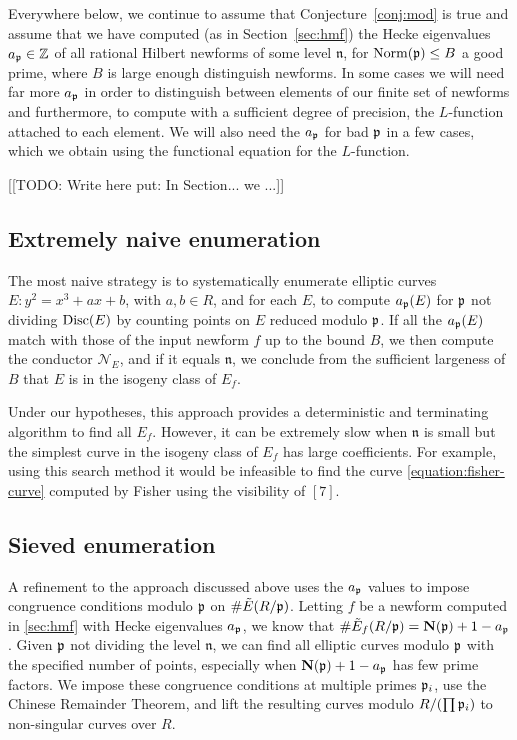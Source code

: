 \documentclass{amsart}
\newcommand{\n}{\mathfrak{n}}
\newcommand{\cN}{\mathcal{N}}
\begin{document}
Everywhere below, we continue to assume that Conjecture~\ref{conj:mod}
is true and assume that we have computed (as in Section~\ref{sec:hmf})
the Hecke eigenvalues $a_{\mathfrak{p}}\in \mathbb{Z}$ of all rational Hilbert newforms of
some level $\n$, for $\operatorname{Norm}(\mathfrak{p})\leq B$ a good prime, where $B$ is
large enough distinguish newforms. In some cases we will need far more
$a_{\mathfrak{p}}$ in order to distinguish between elements of our finite set of
newforms and furthermore, to compute with a sufficient degree of
precision, the $L$-function attached to each element.  We will also
need the $a_{\mathfrak{p}}$ for bad $\mathfrak{p}$ in a few cases, which we obtain
using the functional equation for the $L$-function.

[[TODO: Write here put: In Section... we ...]]

\subsection{Extremely naive enumeration}\label{sec:naive}

The most naive strategy is to systematically enumerate 
 elliptic curves $E: y^2 = x^3 + ax + b$, with $a,b\in R$,
and for each $E$, to compute $a_{\mathfrak{p}}(E)$ for $\mathfrak{p}$ not dividing $\operatorname{Disc}(E)$
 by counting points on $E$ reduced modulo $\mathfrak{p}$.  If all the $a_{\mathfrak{p}}(E)$ match
 with those of the input newform $f$ up to the bound $B$, we then compute
 the conductor $\cN_E$, and if it equals $\n$, we conclude from the sufficient 
largeness of $B$ that $E$ is in the isogeny class of $E_f$.

Under our hypotheses, this approach provides a deterministic and 
terminating algorithm to find all $E_f$. However, it can be extremely slow
 when $\n$ is small but the simplest curve in the isogeny class 
of $E_f$ has large coefficients.  For example, using this search method it would be infeasible to find the curve \eqref{equation:fisher-curve}
computed by Fisher using the visibility of \Sha$[7]$.

\subsection{Sieved enumeration}

A refinement to the approach discussed above uses the $a_{\mathfrak{p}}$ values to impose
congruence conditions modulo $\mathfrak{p}$ on $\#\tilde E(R/\mathfrak{p})$.
Letting $f$ be a newform computed in \ref{sec:hmf} with Hecke eigenvalues
$a_{\mathfrak{p}}$, we know that $\#\tilde E_f(R/\mathfrak{p})=\mathbf{N}(\mathfrak{p})+1-a_{\mathfrak{p}}$.
Given $\mathfrak{p}$ not dividing the level $\n$, we can find all elliptic curves
modulo $\mathfrak{p}$ with the specified number of points, especially when $\mathbf{N}(\mathfrak{p}) +1 - a_{\mathfrak{p}}$ has
few prime factors. We impose these congruence conditions at multiple primes $\mathfrak{p}_i$,
use the Chinese Remainder Theorem, and lift the resulting curves modulo $R/ (\prod \mathfrak{p}_i)$
to non-singular curves over $R$.
\end{document}
